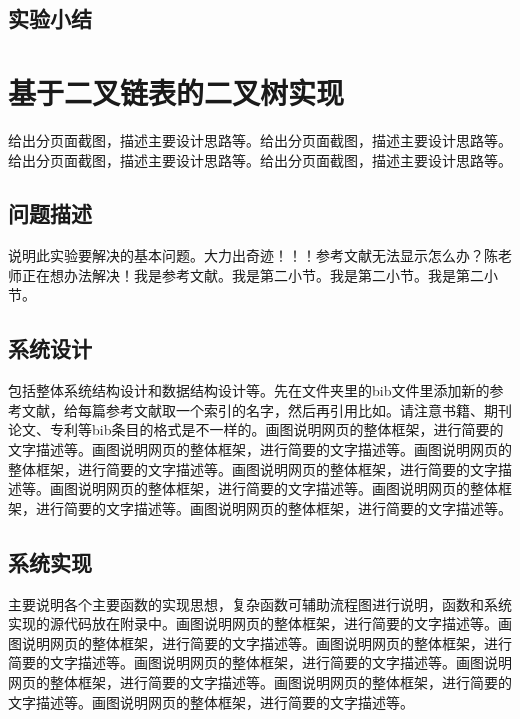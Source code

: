 \documentclass[supercite]{HustGraduPaper}
\theoremstyle{definition}
\begin{document}
    \subsection{实验小结}

    \newpage


    \section{基于二叉链表的二叉树实现}

    给出分页面截图，描述主要设计思路等。给出分页面截图，描述主要设计思路等。给出分页面截图，描述主要设计思路等。给出分页面截图，描述主要设计思路等。

    \subsection{问题描述}

    说明此实验要解决的基本问题。大力出奇迹！！！参考文献无法显示怎么办？陈老师正在想办法解决\cite{STR2021Neurocom, AVS2021Neurocom}！我是参考文献。我是第二小节\cite{Mehrabian1974An}。我是第二小节\cite{Rezaei2014CVPR}。我是第二小节\cite{Ramnath2008IJCV}。

    \subsection{系统设计}

    包括整体系统结构设计和数据结构设计等。先在文件夹里的bib文件里添加新的参考文献，给每篇参考文献取一个索引的名字，然后再引用比如\cite{STR2021Neurocom}\cite{AVS2021Neurocom, Rezaei2014CVPR}。请注意书籍、期刊论文、专利等bib条目的格式是不一样的。画图说明网页的整体框架，进行简要的文字描述等。画图说明网页的整体框架，进行简要的文字描述等。画图说明网页的整体框架，进行简要的文字描述等。画图说明网页的整体框架，进行简要的文字描述等。画图说明网页的整体框架，进行简要的文字描述等。画图说明网页的整体框架，进行简要的文字描述等。画图说明网页的整体框架，进行简要的文字描述等。

    \subsection{系统实现}

    主要说明各个主要函数的实现思想，复杂函数可辅助流程图进行说明，函数和系统实现的源代码放在附录中。画图说明网页的整体框架，进行简要的文字描述等。画图说明网页的整体框架，进行简要的文字描述等。画图说明网页的整体框架，进行简要的文字描述等。画图说明网页的整体框架，进行简要的文字描述等。画图说明网页的整体框架，进行简要的文字描述等。画图说明网页的整体框架，进行简要的文字描述等。画图说明网页的整体框架，进行简要的文字描述等。
\end{document}
